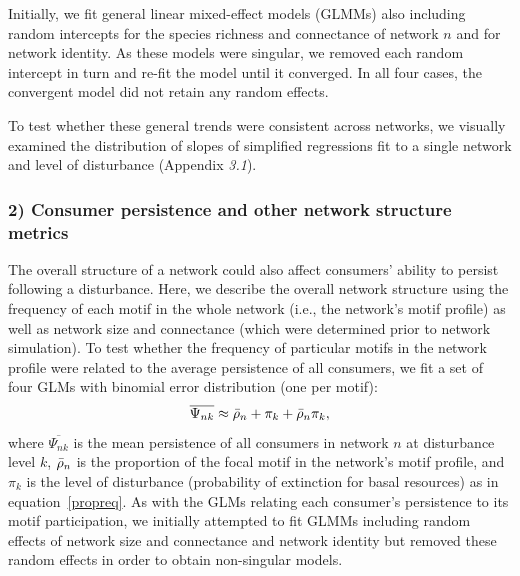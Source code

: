 \documentclass[12pt]{article}
\begin{document}
\begin{spacing}{2.0}
            
            Initially, we fit general linear mixed-effect models (GLMMs) also including random  intercepts for the species richness and connectance of network $n$ and for network identity.
            As these models were singular, we removed each random intercept in turn and re-fit the model until it converged.
            In all four cases, the convergent model did not retain any random effects.
            
            
            To test whether these general trends were consistent across networks, we visually examined the distribution of slopes of simplified regressions fit to a single network and level of disturbance (Appendix \emph{3.1}).




        \subsubsection*{2) Consumer persistence and other network structure metrics}

            The overall structure of a network could also affect consumers' ability to persist following a disturbance.
            Here, we describe the overall network structure using the frequency of each motif in the whole network (i.e., the network's motif profile) as well as network size and connectance (which were determined prior to network simulation).
            To test whether the frequency of particular motifs in the network profile were related to the average persistence of all consumers, we fit a set of four GLMs with binomial error distribution (one per motif):
                \begin{equation}
                    \overline{\Psi_{nk}} \approx \Bar{\rho}_{n} + \pi_{k} + \Bar{\rho}_{n}\pi_{k},
                    \label{netpropeq}
                \end{equation}
            \noindent where $\overline{\Psi_{nk}}$ is the mean persistence of all consumers in network $n$ at disturbance level $k$, $\Bar{\rho}_{n}$ is the proportion of the focal motif in the network's motif profile, and $\pi_k$ is the level of disturbance (probability of extinction for basal resources) as in equation~\ref{propreq}.
            As with the GLMs relating each consumer's persistence to its motif participation, we initially attempted to fit GLMMs including random effects of network size and connectance and network identity but removed these random effects in order to obtain non-singular models.



\end{spacing}
\end{document}
